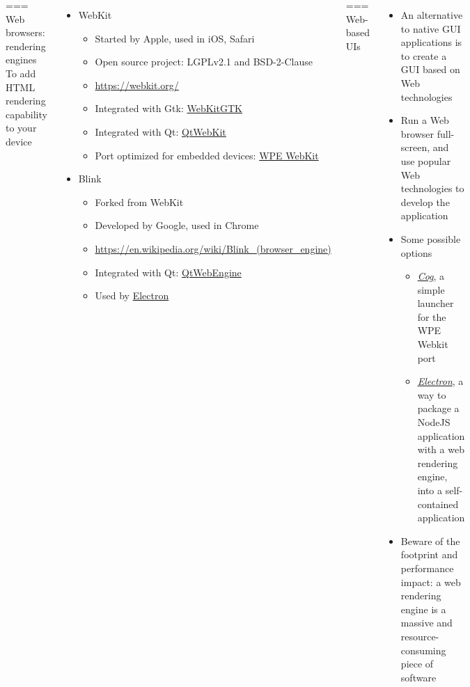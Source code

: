\begin{columns}[T]
=== {Web browsers: rendering engines}
  To add HTML rendering capability to your device
  \begin{itemize}
  \item WebKit
    \begin{itemize}
    \item Started by Apple, used in iOS, Safari
    \item Open source project: LGPLv2.1 and BSD-2-Clause
    \item \url{https://webkit.org/}
    \item Integrated with Gtk: \href{https://webkitgtk.org/}{WebKitGTK}
    \item Integrated with Qt: \href{https://wiki.qt.io/Qt_WebKit}{QtWebKit}
    \item Port optimized for embedded devices: \href{https://wpewebkit.org/}{WPE WebKit}
    \end{itemize}
  \item Blink
    \begin{itemize}
    \item Forked from WebKit
    \item Developed by Google, used in Chrome
    \item \url{https://en.wikipedia.org/wiki/Blink_(browser_engine)}
    \item Integrated with Qt: \href{https://wiki.qt.io/QtWebEngine}{QtWebEngine}
    \item Used by \href{https://www.electronjs.org/}{Electron}
    \end{itemize}
  \end{itemize}


=== {Web-based UIs}
  \begin{itemize}
  \item An alternative to native GUI applications is to create a GUI
    based on Web technologies
  \item Run a Web browser full-screen, and use popular Web
    technologies to develop the application
  \item Some possible options
    \begin{itemize}
    \item {\em \href{https://github.com/Igalia/cog}{Cog}},
      a simple launcher for the WPE Webkit port
    \item {\em \href{https://www.electronjs.org/}{Electron}},
      a way to package a NodeJS application with a
      web rendering engine, into a self-contained application
    \end{itemize}
  \item Beware of the footprint and performance impact: a web
    rendering engine is a massive and resource-consuming piece of
    software
  \end{itemize}



\end{columns}

